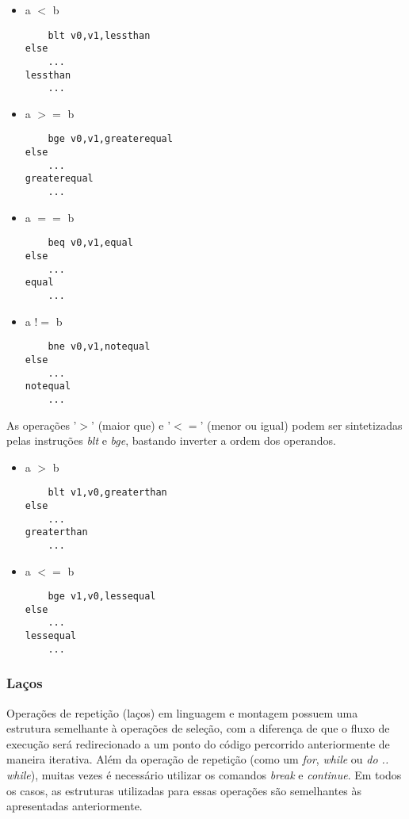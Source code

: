 \documentclass[11pt,a4paper]{report}
\begin{document}
\begin{multicols}{2}
\begin{itemize}
\item a $<$ b
\begin{verbatim}
    blt v0,v1,lessthan
else
    ...
lessthan
    ...
\end{verbatim}

\item a $>=$ b
\begin{verbatim}
    bge v0,v1,greaterequal
else
    ...
greaterequal
    ...
\end{verbatim}

\item a $==$ b
\begin{verbatim}
    beq v0,v1,equal
else
    ...
equal
    ...
\end{verbatim}

\item a $!=$ b
\begin{verbatim}
    bne v0,v1,notequal
else
    ...
notequal
    ...
\end{verbatim}
\end{itemize}
\end{multicols}

As operações '$>$' (maior que) e '$<=$' (menor ou igual) podem ser
sintetizadas pelas instruções \textit{blt} e \textit{bge}, bastando
inverter a ordem dos operandos.

\begin{multicols}{2}
\begin{itemize}
\item a $>$ b
\begin{verbatim}
    blt v1,v0,greaterthan
else
    ...
greaterthan
    ...
\end{verbatim}

\item a $<=$ b
\begin{verbatim}
    bge v1,v0,lessequal
else
    ...
lessequal
    ...
\end{verbatim}
\end{itemize}
\end{multicols}

\subsubsection{Laços}

Operações de repetição (laços) em linguagem e montagem possuem uma
estrutura semelhante à operações de seleção, com a diferença de que
o fluxo de execução será redirecionado a um ponto do código percorrido
anteriormente de maneira iterativa. Além da operação de repetição
(como um \textit{for}, \textit{while} ou \textit{do .. while}), muitas
vezes é necessário utilizar os comandos \textit{break} e \textit{continue}.
Em todos os casos, as estruturas utilizadas para essas operações são
semelhantes às apresentadas anteriormente.
\end{document}
